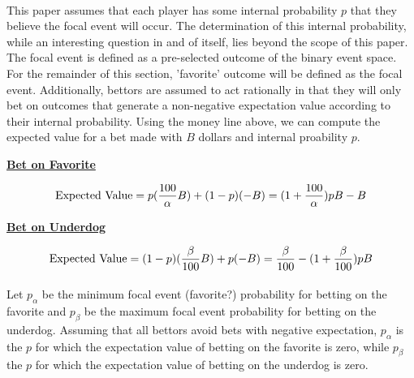 \documentclass[12pt,letterpaper]{article}
\begin{document}
\paragraph{} This paper assumes that each player has some internal probability $p$ that they believe the focal event will occur. The determination of this internal probability, while an interesting question in and of itself, lies beyond the scope of this paper. The focal event is defined as a pre-selected outcome of the binary event space. For the remainder of this section, 'favorite' outcome will be defined as the focal event. Additionally, bettors are assumed to act rationally in that they will only bet on outcomes that generate a non-negative expectation value according to their internal probability. Using the money line above, we can compute the expected value for a bet made with $B$ dollars and internal proability $p$. \\


\begin{center}
\underline{\textbf{Bet on Favorite}}
\end{center}
\vspace{-1pt}
\begin{equation}
\textnormal{Expected Value} = p (\frac{100}{\alpha}B)+(1-p) (-B)= (1+ \frac{100}{\alpha} )p B - B   
\end{equation}

\begin{center}
\underline{\textbf{Bet on Underdog}}
\end{center}
\vspace{-1pt}
\begin{equation}
\textnormal{Expected Value} =(1-p) (\frac{\beta}{100}B)+p (-B) = \frac{\beta}{100}  - (1+\frac{\beta}{100})p B
\end{equation}

\paragraph{} Let $p_{\alpha}$ be the minimum focal event (favorite?) probability for betting on the favorite and $p_{\beta}$ be the maximum focal event probability for betting on the underdog. Assuming that all bettors avoid bets with negative expectation, $p_{\alpha}$ is the $p$ for which the expectation value of betting on the favorite is zero, while $p_{\beta}$ the $p$ for which the expectation value of betting on the underdog is zero. 
\end{document}
